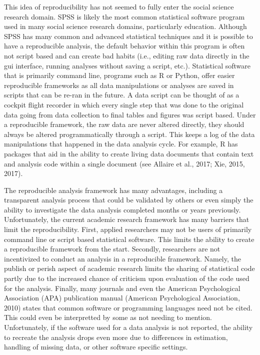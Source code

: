 \documentclass[english,man]{apa6}
\theoremstyle{definition}
\theoremstyle{definition}
\theoremstyle{definition}
\theoremstyle{remark}
\begin{document}
This idea of reproducibility has not seemed to fully enter the social
science research domain. SPSS is likely the most common statistical
software program used in many social science research domains,
particularly education. Although SPSS has many common and advanced
statistical techniques and it is possible to have a reproducible
analysis, the default behavior within this program is often not script
based and can create bad habits (i.e., editing raw data directly in the
gui interface, running analyses without saving a script, etc.).
Statistical software that is primarily command line, programs such as R
or Python, offer easier reproducible frameworks as all data
manipulations or analyses are saved in scripts that can be re-ran in the
future. A data script can be thought of as a cockpit flight recorder in
which every single step that was done to the original data going from
data collection to final tables and figures was script based. Under a
reproducible framework, the raw data are never altered directly, they
should always be altered programmatically through a script. This keeps a
log of the data manipulations that happened in the data analysis cycle.
For example, R has packages that aid in the ability to create living
data documents that contain text and analysis code within a single
document (see Allaire et al., 2017; Xie, 2015, 2017).

The reproducible analysis framework has many advantages, including a
transparent analysis process that could be validated by others or even
simply the ability to investigate the data analysis completed months or
years previously. Unfortunately, the current academic research framework
has many barriers that limit the reproducibility. First, applied
researchers may not be users of primarily command line or script based
statistical software. This limits the ability to create a reproducible
framework from the start. Secondly, researchers are not incentivized to
conduct an analysis in a reproducible framework. Namely, the publish or
perish aspect of academic research limits the sharing of statistical
code partly due to the increased chance of criticism upon evaluation of
the code used for the analysis. Finally, many journals and even the
American Psychological Association (APA) publication manual (American
Psychological Association, 2010) states that common software or
programming languages need not be cited. This could even be interpretted
by some as not needing to mention. Unfortunately, if the software used
for a data analysis is not reported, the ability to recreate the
analysis drops even more due to differences in estimation, handling of
missing data, or other software specific settings.
\end{document}
